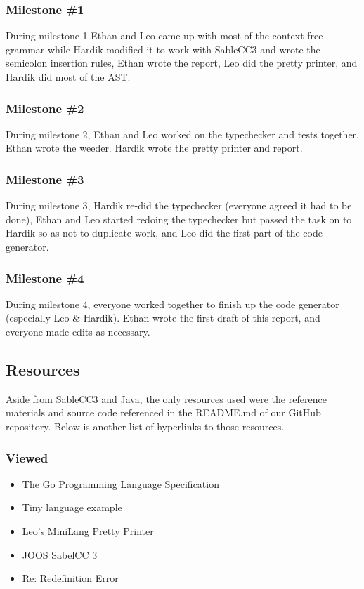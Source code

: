 \documentclass{article}
\begin{document}
\subsubsection{Milestone \#1}
During milestone 1 Ethan and Leo came up with most of the context-free grammar while Hardik modified it to work with SableCC3 and wrote the semicolon insertion rules, Ethan wrote the report, Leo did the pretty printer, and Hardik did most of the AST. 

\subsubsection{Milestone \#2}
During milestone 2, Ethan and Leo worked on the typechecker and tests together. Ethan wrote the weeder. Hardik wrote the pretty printer and report. 

\subsubsection{Milestone \#3}
During milestone 3, Hardik re-did the typechecker (everyone agreed it had to be done), Ethan and Leo started redoing the typechecker but passed the task on to Hardik so as not to duplicate work, and Leo did the first part of the code generator. 

\subsubsection{Milestone \#4}
During milestone 4, everyone worked together to finish up the code generator (especially Leo \& Hardik). Ethan wrote the first draft of this report, and everyone made edits as necessary.


\subsection{Resources}
Aside from SableCC3 and Java, the only resources used were the reference materials and source code referenced in the README.md of our GitHub repository. Below is another list of hyperlinks to those resources.

\subsubsection{Viewed}
\begin{itemize}
\item \href{https://golang.org/ref/spec}{The Go Programming Language Specification}
\item \href{http://www.sable.mcgill.ca/~hendren/520/2016/tiny/}{Tiny language example}
\item \href{https://github.com/leo-teng-long/minipart2/blob/master/src/mini/PrettyPrinter.java}{Leo's MiniLang Pretty Printer}
\item \href{http://www.sable.mcgill.ca/~hendren/520/2016/joos/jjoos-scc-3/}{JOOS SabelCC 3}
\item \href{http://www.sable.mcgill.ca/listarchives/sablecc-list/msg00639.html}{Re: Redefinition Error}
\end{itemize}
\end{document}

